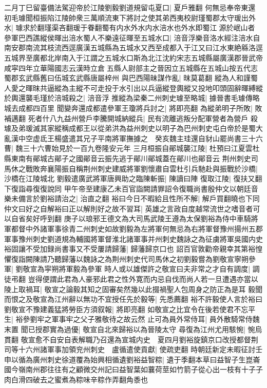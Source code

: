 二月丁巳留臺備法駕迎帝於江陵劉毅劉道規留屯夏口|{
	夏戶雅翻}
何無忌奉帝東還　初毛璩聞桓振陷江陵帥衆三萬順流東下將討之使其弟西夷校尉瑾蜀郡太守瑗出外水|{
	璩求於翻瑾渠吝翻瑗于眷翻蜀有内水外水内水涪水也外水即蜀江源於岷山者}
參軍巴西譙縱侯暉出涪水蜀人不樂遠征暉至五城水口|{
	涪音浮樂音洛水經注涪水自南安郡南流其枝流西逕廣漢五城縣為五城水又西至成都入于江又曰江水東絶緜洛逕五城界至廣都北岸南入于江謂之五城水口斯為北江沈約宋志五城縣屬廣漢郡晉武帝咸寜四年立華陽國志云漢時立倉五縣人尉部主之晉因立五城縣在五城山按五代志蜀郡玄武縣舊曰伍城玄武縣唐屬梓州}
與巴西陽昧謀作亂|{
	昩莫葛翻}
縱為人和謹蜀人愛之暉昩共逼縱為主縱不可走投于水引出以兵逼縱登輿縱又投地叩頭固辭暉縛縱於輿還襲毛瑾於涪城殺之|{
	涪音浮}
推縱為梁秦二州刺史璩至略城|{
	據晉書毛璩傳略城去成都四百里}
聞變奔還成都遣參軍王瓊將兵討之|{
	將即亮翻}
為縱弟明子所敗|{
	敗補邁翻}
死者什八九益州營戶李騰開城納縱兵|{
	民有流離逃叛分配軍營者為營戶}
殺璩及弟瑗滅其家縱稱成都王以從弟洪為益州刺史以明子為巴州刺史屯白帝於是蜀大亂漢中空虚氐王楊盛遣其兄子平南將軍撫據之　癸亥魏主珪還自豺山罷尚書三十六曹|{
	魏三十六曹始見於一百九卷隆安元年}
三月桓振自鄖城襲江陵|{
	杜預曰江夏雲杜縣東南有鄖城古鄖子之國鄖音云振先逃于鄖川鄖城蓋在鄖川也鄖音云}
荆州刺史司馬休之戰敗奔襄陽振自稱荆州刺史建威將軍劉懷肅自雲杜引兵馳赴與振戰於沙橋|{
	沙橋在江陵城北}
劉毅遣廣武將軍唐興助之臨陳斬振|{
	陳讀曰陣}
復取江陵|{
	復扶又翻下復詣尋復復說同}
甲午帝至建康乙未百官詣闕請罪詔令復職尚書殷仲文以朝廷音樂未備言於劉裕請治之|{
	治直之翻}
裕曰今日不暇給且性所不解|{
	解戶買翻曉也下同}
仲文曰好之自解裕曰正以解則好之故不習耳|{
	英雄之言政自度越常流世之嗜音者可以自省矣好呼到翻}
庚子以琅邪王德文為大司馬武陵王遵為太保劉裕為侍中車騎將軍都督中外諸軍事徐青二州刺史如故劉毅為左將軍何無忌為右將軍督豫州揚州五郡軍事豫州刺史劉道規為輔國將軍督淮北諸軍事并州刺史魏詠之為征虜將軍吳國内史裕固讓不受加録尚書事又不受屢請歸藩|{
	歸藩歸京口也}
詔百官敦勸帝親幸其第裕惶懼復詣闕陳請乃聽歸藩以魏詠之為荆州刺史代司馬休之初劉毅嘗為劉敬宣寧朔參軍|{
	劉敬宣為寜朔將軍毅為參軍}
時人或以雄傑許之敬宣曰夫非常之才自有調度|{
	調徒弔翻}
豈得便謂此君為人豪邪此君之性外寛而内忌自伐而尚人若一旦遭遇亦當以陵上取禍耳|{
	敬宣之論毅其知之固審矣然幾以此掇禍聖人包周身之防正為是耳}
毅聞而恨之及敬宣為江州辭以無功不宜授任先於毅等|{
	先悉薦翻}
裕不許毅使人言於裕曰劉敬宣不豫建義猛將勞臣方須叙報|{
	將即亮翻}
如敬宣之比宜令在後若使君不忘平生|{
	裕參劉牢之軍事牢之父子雅敬待之故云然}
止可為員外常侍耳|{
	員外散騎常侍魏末置}
聞已授郡實為過優|{
	敬宣自北來歸裕以為晉陵太守}
尋復為江州尤用駭惋|{
	惋烏貫翻}
敬宣愈不自安自表解職乃召還為宣城内史　夏四月劉裕旋鎮京口改授都督荆司等十六州諸軍事加領兖州刺史　盧循遣使貢獻|{
	使疏吏翻}
時朝廷新定未暇征討壬申以循為廣州刺史徐道覆為始興相循遺劉裕益智粽|{
	遺于季翻本草曰益智子生崑崙國今嶺南州郡往往有之顧微交州記曰益智葉如蘘荷莖如竹箭子從心出一枝有十子子肉白滑四破去之蜜煮為粽味辛粽作弄翻角黍也}
